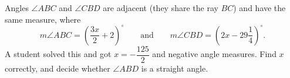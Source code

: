 Angles $\angle ABC$ and $\angle CBD$ are adjacent (they share the ray $BC$) and have the same measure, where
\[
m\angle ABC=\left(\dfrac{3x}{2}+2\right)^\circ\qquad\text{and}\qquad m\angle CBD=\left(2x-29\dfrac{1}{4}\right)^\circ .
\]
A student solved this and got $x=-\dfrac{125}{2}$ and negative angle measures. Find $x$ correctly, and decide whether $\angle ABD$ is a straight angle.
